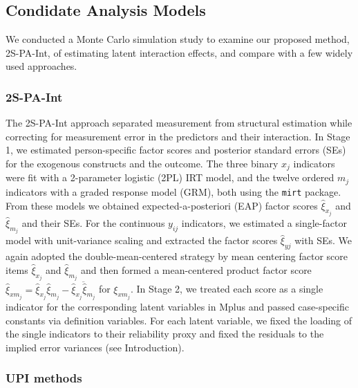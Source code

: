 \documentclass[
  man]{apa6}
\begin{document}
\subsection{Condidate Analysis Models}\label{condidate-analysis-models}

We conducted a Monte Carlo simulation study to examine our proposed method, 2S-PA-Int, of estimating latent interaction effects, and compare with a few widely used approaches.

\subsubsection{2S-PA-Int}\label{s-pa-int}

The 2S-PA-Int approach separated measurement from structural estimation while correcting for measurement error in the predictors and their interaction. In Stage 1, we estimated person-specific factor scores and posterior standard errors (SEs) for the exogenous constructs and the outcome. The three binary \(x_{j}\) indicators were fit with a 2-parameter logistic (2PL) IRT model, and the twelve ordered \(m_{j}\) indicators with a graded response model (GRM), both using the \texttt{mirt} package. From these models we obtained expected-a-posteriori (EAP) factor scores \(\hat{\xi}_{x_{j}}\) and \(\hat{\xi}_{m_{j}}\) and their SEs. For the continuous \(y_{ij}\) indicators, we estimated a single-factor model with unit-variance scaling and extracted the factor scores \(\hat{\xi}_{yj}\) with SEs. We again adopted the double-mean-centered strategy by mean centering factor score items \(\hat{\xi}_{x_{j}}\) and \(\hat{\xi}_{m_{j}}\) and then formed a mean-centered product factor score \(\widehat{\xi}_{xm_{j}} = \widehat{\xi}_{x_{j}}\widehat{\xi}_{m_{j}}-\overline{\widehat{\xi}_{x_{j}}\widehat{\xi}_{m_{j}}}\) for \(\xi_{xm_{j}}\). In Stage 2, we treated each score as a single indicator for the corresponding latent variables in Mplus and passed case-specific constants via definition variables. For each latent variable, we fixed the loading of the single indicators to their reliability proxy and fixed the residuals to the implied error variances (see Introduction).

\subsubsection{UPI methods}\label{upi-methods}
\end{document}
